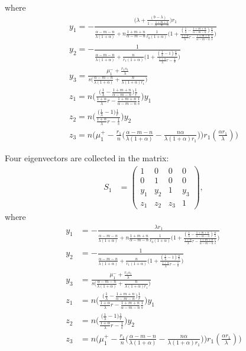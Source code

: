 \documentclass[a4paper,11pt]{article}
\begin{document}
\begin{itemize}
where
\begin{align*}
 y_1=-\frac{\Big(\lambda + \frac{(b-\lambda)}{1-\frac{1+m+n}{\alpha-m-n}}\Big)r_1}{\frac{\alpha-m-n}{\lambda(1+\alpha)} + n\frac{1+m+n}{\alpha-m-n}\frac{1}{r_0(1+\alpha)}\Big(1 + \frac{(\frac{1}{\lambda}-\frac{1+m+n}{\alpha-m-n})\frac{\alpha}{s}}{ \frac{1+\alpha}{\lambda}r -\frac{1+m+n}{\alpha-m-n} \frac{1}{s} }\Big) }\\
 y_2=-\frac{1}{\frac{\alpha-m-n}{\lambda(1+\alpha)} + \frac{n}{r_1(1+\alpha)}\Big(1 + \frac{(\frac{1}{\lambda}-1)\frac{\alpha}{s}}{ \frac{1+\alpha}{\lambda}r - \frac{1}{s} }\Big) }\\
 y_3=\frac{\mu_1^- +\frac{r_1s_1}{\lambda}}{s\Big(\frac{\alpha-m-n}{\lambda(1+\alpha)} + \frac{n}{\lambda(1+\alpha)r_1}\Big)}\\
 z_1=n\bigg(\frac{\big(\frac{1}{\lambda}-\frac{1+m+n}{\alpha-m-n}\big)\frac{1}{r}}{ \frac{1+\alpha}{\lambda}r -\frac{1+m+n}{\alpha-m-n} \frac{1}{s} }\bigg)y_1 \\
 z_2=n\bigg(\frac{\big(\frac{1}{\lambda}-1\big)\frac{1}{r}}{ \frac{1+\alpha}{\lambda}r - \frac{1}{s} }\bigg)y_2 \\
 z_3=n\bigg(\mu_1^+-\frac{r_1}{n}\Big(\frac{\alpha-m-n}{\lambda(1+\alpha)} - \frac{n\alpha}{\lambda(1+\alpha)r_1}\Big)\bigg)r_1(\frac{\alpha r_1}{\lambda})\bigg)
\end{align*}


Four eigenvectors are collected in the matrix:
\begin{align*}
 S_1&=
 \begin{pmatrix}
    1 & 0 & 0 & 0\\
    0 & 1 & 0 & 0\\
    y_1 & y_2 & 1 & y_3\\
    z_1 & z_2 & z_3 &1
 \end{pmatrix},
\end{align*}
where
\begin{align*}
 y_1&=-\frac{\lambda r_1}{\frac{\alpha-m-n}{\lambda(1+\alpha)} + n\frac{1+m+n}{\alpha-m-n}\frac{1}{r_0(1+\alpha)}\Big(1 + \frac{(\frac{1}{\lambda}-\frac{1+m+n}{\alpha-m-n})\frac{\alpha}{s}}{ \frac{1+\alpha}{\lambda}r -\frac{1+m+n}{\alpha-m-n} \frac{1}{s} }\Big) }\\
 y_2&=-\frac{1}{\frac{\alpha-m-n}{\lambda(1+\alpha)} + \frac{n}{r_1(1+\alpha)}\Big(1 + \frac{(\frac{1}{\lambda}-1)\frac{\alpha}{s}}{ \frac{1+\alpha}{\lambda}r - \frac{1}{s} }\Big) }\\
 y_3&=\frac{\mu_1^- +\frac{r_1s_1}{\lambda}}{s\Big(\frac{\alpha-m-n}{\lambda(1+\alpha)} + \frac{n}{\lambda(1+\alpha)r_1}\Big)}\\
 z_1&=n\bigg(\frac{\big(\frac{1}{\lambda}-\frac{1+m+n}{\alpha-m-n}\big)\frac{1}{r}}{ \frac{1+\alpha}{\lambda}r -\frac{1+m+n}{\alpha-m-n} \frac{1}{s} }\bigg)y_1 \\
 z_2&=n\bigg(\frac{\big(\frac{1}{\lambda}-1\big)\frac{1}{r}}{ \frac{1+\alpha}{\lambda}r - \frac{1}{s} }\bigg)y_2 \\
 z_3&=n\bigg(\mu_1^+-\frac{r_1}{n}\Big(\frac{\alpha-m-n}{\lambda(1+\alpha)} - \frac{n\alpha}{\lambda(1+\alpha)r_1}\Big)\bigg)r_1(\frac{\alpha r_1}{\lambda})\bigg)
\end{align*}


\end{itemize}
\end{document}
